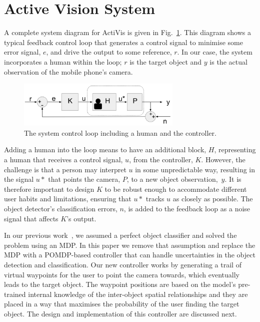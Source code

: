 \documentclass[runningheads]{llncs}
\begin{document}
\section{Active Vision System}\label{sec:active-vision}

A complete system diagram for ActiVis is given in Fig.~\ref{fig:sys-diagram}. 
This diagram shows a typical feedback control loop that generates a control signal to minimise some error signal, $e$, and drive the output to some reference, $r$. In our case, the system incorporates a human within the loop; $r$ is the target object and $y$ is the actual observation of the mobile phone's camera.

\begin{figure}[t]
  \centering
  \includegraphics[width=0.7\textwidth]{figures/control_loop.png}
  \caption{The system control loop including a human and the controller.}\label{fig:sys-diagram}
\end{figure}

Adding a human into the loop means to have an additional block, $H$, representing a human that receives a control signal, $u$, from the controller, $K$. 
However, the challenge is that a person may interpret $u$ in some unpredictable way, resulting in the signal $u*$ that points the camera, $P$, to a new object observation,~$y$.
It is therefore important to design $K$ to be robust enough to accommodate different user habits and limitations, ensuring that $u*$ tracks $u$ as closely as possible. 
The object detector's classification errors, $n$, is added to the feedback loop as a noise signal that affects $K$'s output.

In our previous work~\cite{lock2019active}, we assumed a perfect object classifier and solved the problem using an MDP.
In this paper we remove that assumption and replace the MDP with a POMDP-based controller that can handle uncertainties in the object detection and classification. 
Our new controller works by generating a trail of virtual waypoints for the user to point the camera towards, which eventually leads to the target object.
The waypoint positions are based on the model's pre-trained internal knowledge of the inter-object spatial relationships and they are placed in a way that maximises the probability of the user finding the target object.
The design and implementation of this controller are discussed next.
\end{document}
